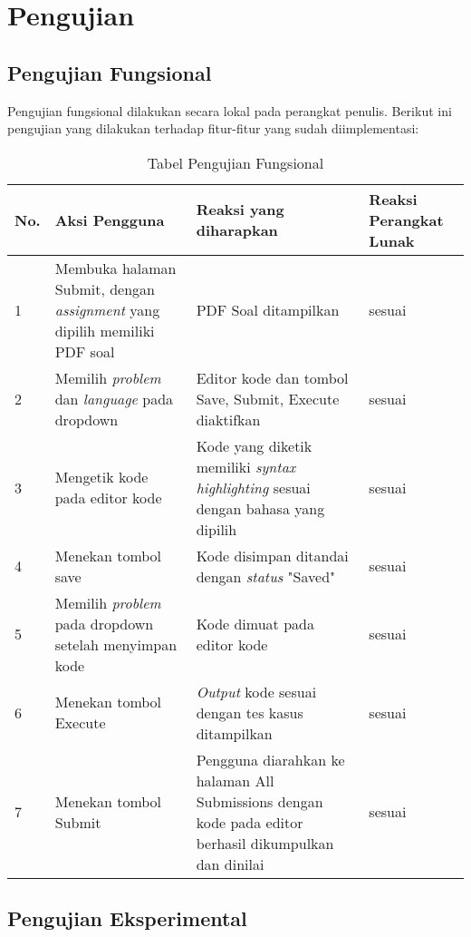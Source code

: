 \section{Pengujian}
\label{subsec:5:pengujian}

\subsection{Pengujian Fungsional}
\label{subsec:5:fungsional}

Pengujian fungsional dilakukan secara lokal pada perangkat penulis. Berikut ini pengujian yang dilakukan terhadap fitur-fitur yang sudah diimplementasi:

\begin{table}[H]
	\centering
	\caption{Tabel Pengujian Fungsional}
	\begin{tabular}{|p{0.5cm}| p{5.5cm}| p{6cm}| p{2.5cm}|} \hline
	No.	&	Aksi Pengguna	&	Reaksi yang diharapkan	&	Reaksi Perangkat Lunak \\ \hline
	1 	&  Membuka halaman Submit, dengan \textit{assignment} yang dipilih memiliki PDF soal & PDF Soal ditampilkan &	sesuai	\\ \hline
	2 	&  Memilih \textit{problem} dan \textit{language} pada dropdown & Editor kode dan tombol Save, Submit, Execute diaktifkan &	sesuai	\\ \hline
	3 	&  Mengetik kode pada editor kode & Kode yang diketik memiliki \textit{syntax highlighting} sesuai dengan bahasa yang dipilih &	sesuai	\\ \hline
	4 	&  Menekan tombol save & Kode disimpan ditandai dengan \textit{status} "Saved" &	sesuai	\\ \hline
	5 	&  Memilih \textit{problem} pada dropdown setelah menyimpan kode & Kode dimuat pada editor kode &	sesuai	\\ \hline
	6 	&  Menekan tombol Execute & \textit{Output} kode sesuai dengan tes kasus ditampilkan &	sesuai	\\ \hline
	7 	&  Menekan tombol Submit & Pengguna diarahkan ke halaman All Submissions dengan kode pada editor berhasil dikumpulkan dan dinilai  &	sesuai	\\ \hline
	\end{tabular}
	\label{table:fungsional}
\end{table}


\subsection{Pengujian Eksperimental}
\label{subsec:5:eksperimental}

